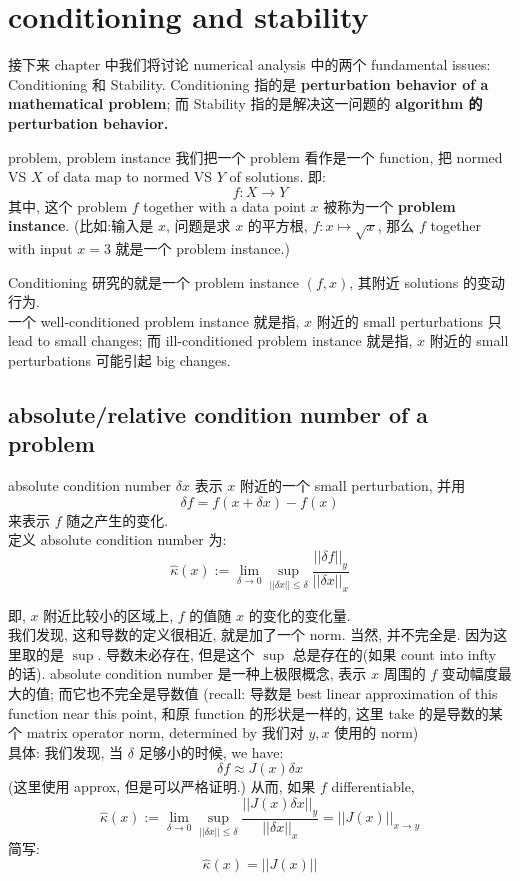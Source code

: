 \chapter{conditioning and stability\cite{doi:10.1137/1.9780898719574.ch3}}
接下来 chapter 中我们将讨论 numerical analysis 中的两个 fundamental issues: Conditioning 和 Stability. Conditioning 指的是 \textbf{perturbation behavior of a mathematical problem}; 而 Stability 指的是解决这一问题的 \textbf{algorithm 的 perturbation behavior.}

\begin{definition}{problem, problem instance}
我们把一个 problem 看作是一个 function, 把 normed VS $X$ of data map to normed VS $Y$ of solutions. 即: \[
f: X \to Y
\]    
其中, 这个 problem $f$ together with a data point $x$ 被称为一个 \textbf{problem instance}. (比如:输入是 $x$, 问题是求 $x$ 的平方根, $f: x\mapsto \sqrt{x}$, 那么 $f$ together with input $x=3$ 就是一个 problem instance.)
\end{definition}

Conditioning 研究的就是一个 problem instance $(f,x)$, 其附近 solutions 的变动行为.\\
一个 well-conditioned problem instance 就是指, $x$ 附近的 small perturbations 只 lead to small changes; 而 ill-conditioned problem instance 就是指, $x$ 附近的 small perturbations 可能引起 big changes. 


\section{absolute/relative condition number of a problem}
\begin{definition}{absolute condition number}
$\delta x$ 表示 $x$ 附近的一个 small perturbation, 并用 \[
\delta f = f(x + \delta x) - f(x)
\]
来表示 $f$ 随之产生的变化. \\
定义 absolute condition number 为: \[
\hat \kappa(x) := \lim_{\delta \to 0} \sup_{||\delta x || \leq \delta} \frac{ ||\delta f ||_y}{||\delta x||_x}
\]
\end{definition}
\begin{remark}
    即, $x$ 附近比较小的区域上, $f$ 的值随 $x$ 的变化的变化量.\\
   我们发现, 这和导数的定义很相近, 就是加了一个 norm. 当然, 并不完全是. 因为这里取的是 $\sup$. 导数未必存在, 但是这个 $\sup$ 总是存在的(如果 count into infty 的话). absolute condition number 是一种上极限概念, 表示 $x$ 周围的 $f$ 变动幅度最大的值; 而它也不完全是导数值 (recall: 导数是 best linear approximation of this function near this point, 和原 function 的形状是一样的, 这里 take 的是导数的某个 matrix operator norm, determined by 我们对 $y,x$ 使用的 norm)\\
具体: 我们发现, 当 $\delta$ 足够小的时候, we have: $$
\delta f \approx J(x) \delta x
$$
(这里使用 approx, 但是可以严格证明.) 从而, 如果 $f$ differentiable,\[
\hat \kappa(x) := \lim_{\delta \to 0} \sup_{||\delta x || \leq \delta} \frac{ ||J(x) \delta x ||_y}{||\delta x||_x} = ||J(x)||_{x\to y}
\]
简写: \[
    \hat\kappa(x) = ||J(x)||
    \]
\end{remark}


